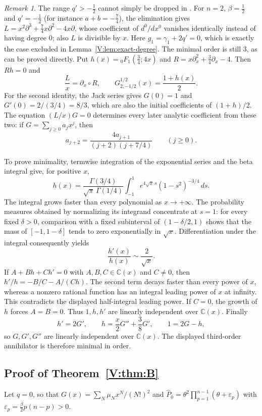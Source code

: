 \documentclass[11pt,a4paper]{article}
\theoremstyle{definition}
\theoremstyle{remark}
\newtheorem{remark}[theorem]{Remark}
\newcommand{\C}{\mathbb C}
\numberwithin{equation}{section}
\begin{document}
\begin{remark}\label{V:rem:FWfalse}
The range $q'>-\frac12$ cannot simply be dropped in \cite[Prop.~4.1]{FW26}. For $n=2$, $\beta=\frac12$ and $q'=-\frac12$ (for instance $a+b=-\frac74$), the elimination gives $L=x^2\partial^3+\frac74x\partial^2-4x\partial$, whose coefficient of $d^0/dx^0$ vanishes identically instead of having degree $0$; also $L$ is divisible by $x$. Here $g_1=\gamma_1+2q'=0$, which is exactly the case excluded in Lemma~\ref{V:lem:exact-degree}. 
The minimal order is still $3$, as can be proved directly.
Put $h(x)={}_0F_1(\tfrac34;4x)$ and
$R=x\partial_x^2+\tfrac34\partial_x-4$. Then $Rh=0$ and
\[
 \frac Lx=\partial_x\circ R,
 \qquad
 G^{1/2}_{2,-1/2}(x)=\frac{1+h(x)}2.
\]
For the second identity, the Jack series gives $G(0)=1$ and
$G'(0)=2/(3/4)=8/3$, which are also the initial coefficients of
$(1+h)/2$. The equation $(L/x)G=0$ determines every later analytic
coefficient from these two: if $G=\sum_{j\ge0}a_jx^j$, then
\[
 a_{j+2}=\frac{4a_{j+1}}{(j+2)(j+7/4)}\qquad(j\ge0).
\]

To prove minimality, termwise integration of the exponential series
and the beta integral give, for positive $x$,
\[
 h(x)=\frac{\Gamma(3/4)}{\sqrt\pi\,\Gamma(1/4)}
       \int_{-1}^1 e^{4\sqrt{x}\,s}(1-s^2)^{-3/4}\,ds.
\]
The integral grows faster than every polynomial as $x\to+\infty$.
The probability measures obtained by normalizing its integrand
concentrate at $s=1$: for every fixed $\delta>0$, comparison with a
fixed subinterval of $(1-\delta/2,1)$ shows that the mass of
$[-1,1-\delta]$ tends to zero exponentially in $\sqrt{x}$.
Differentiation under the integral consequently yields
\[
 \frac{h'(x)}{h(x)}\sim\frac2{\sqrt{x}}.
\]
If $A+B h+C h'=0$ with $A,B,C\in\C(x)$ and $C\ne0$, then
$h'/h=-B/C-A/(Ch)$. The second term decays faster than every power
of $x$, whereas a nonzero rational function has an integral leading
power of $x$ at infinity. This contradicts the displayed half-integral
leading power. If $C=0$, the growth of $h$ forces $A=B=0$.
Thus $1,h,h'$ are linearly independent over $\C(x)$.
Finally
\[
 h'=2G',\qquad h=\frac x2G''+\frac38G',\qquad 1=2G-h,
\]
so $G,G',G''$ are linearly independent over $\C(x)$.
The displayed third-order annihilator is therefore minimal in order.
\end{remark}

\subsection{Proof of Theorem~\ref{V:thm:B}}
Let $q=0$, so that $G(x)=\sum_N\mu_Nx^N/(N!)^2$ and $\hat P_0=\theta^2\prod_{p=1}^{n-1}(\theta+\varepsilon_p)$ with $\varepsilon_p=\frac\beta2p(n-p)>0$.
\end{document}

